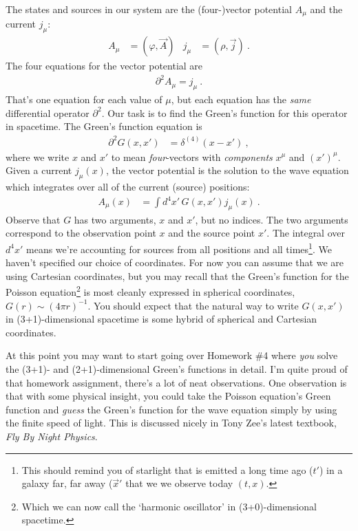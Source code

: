 The states and sources in our system are the (four-)vector potential $A_\mu$ and the current $j_\mu$: 
\begin{align}
	A_\mu &= (\varphi, \vec{A})
	&
	j_\mu &= (\rho, \vec{j}) \ .
\end{align}
The four equations for the vector potential are
\begin{align}
	\partial^2 A_\mu = j_\mu \ .
\end{align}
That's one equation for each value of $\mu$, but each equation has the \emph{same} differential operator $\partial^2$. Our task is to find the Green's function for this operator in spacetime. The Green's function equation is
\begin{align}
	\partial^2 G(x,x') &= \delta^{(4)}(x-x') \ ,
	\label{eq:wave:eq:Greens:eq}
\end{align}
where we write $x$ and $x'$ to mean \emph{four}-vectors with \emph{components} $x^\mu$ and $(x')^\mu$. Given a current $j_\mu(x)$, the vector potential is the solution to the wave equation which integrates over all of the current (source) positions:
\begin{align}
	A_\mu(x) &= \int d^4x' \, G(x,x') j_\mu(x) \ .
\end{align}
Observe that $G$ has two arguments, $x$ and $x'$, but no indices. The two arguments correspond to the observation point $x$ and the source point $x'$. The integral over $d^4x'$ means we're accounting for sources from all positions and all times\footnote{This should remind you of starlight that is emitted a long time ago ($t'$) in a galaxy far, far away ($\vec{x}'$ that we we observe today $(t,x)$.}. We haven't specified our choice of coordinates. For now you can assume that we are using Cartesian coordinates, but you may recall that the Green's function for the Poisson equation\footnote{Which we can now call the `harmonic oscillator' in (3+0)-dimensional spacetime.} is most cleanly expressed in spherical coordinates, $G(r)\sim (4\pi r)^{-1}$. You should expect that the natural way to write $G(x,x')$ in (3+1)-dimensional spacetime is some hybrid of spherical and Cartesian coordinates.

\begin{exercise}\label{ex:guess:Greens}
At this point you may want to start going over Homework \#4 where \emph{you} solve the (3+1)- and (2+1)-dimensional Green's functions in detail. I'm quite proud of that homework assignment, there's a lot of neat observations. One observation is that with some physical insight, you could take the Poisson equation's Green function and \emph{guess} the Green's function for the wave equation simply by using the finite speed of light. This is discussed nicely in Tony Zee's latest textbook, \emph{Fly By Night Physics}. 
\end{exercise}


